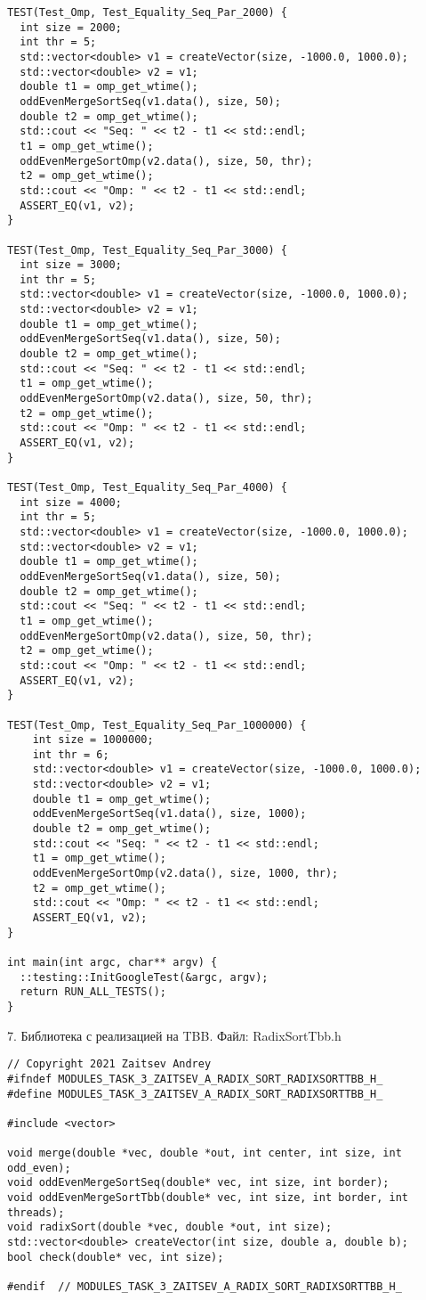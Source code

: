 \documentclass{report}
\begin{document}
\begin{lstlisting}
TEST(Test_Omp, Test_Equality_Seq_Par_2000) {
  int size = 2000;
  int thr = 5;
  std::vector<double> v1 = createVector(size, -1000.0, 1000.0);
  std::vector<double> v2 = v1;
  double t1 = omp_get_wtime();
  oddEvenMergeSortSeq(v1.data(), size, 50);
  double t2 = omp_get_wtime();
  std::cout << "Seq: " << t2 - t1 << std::endl;
  t1 = omp_get_wtime();
  oddEvenMergeSortOmp(v2.data(), size, 50, thr);
  t2 = omp_get_wtime();
  std::cout << "Omp: " << t2 - t1 << std::endl;
  ASSERT_EQ(v1, v2);
}

TEST(Test_Omp, Test_Equality_Seq_Par_3000) {
  int size = 3000;
  int thr = 5;
  std::vector<double> v1 = createVector(size, -1000.0, 1000.0);
  std::vector<double> v2 = v1;
  double t1 = omp_get_wtime();
  oddEvenMergeSortSeq(v1.data(), size, 50);
  double t2 = omp_get_wtime();
  std::cout << "Seq: " << t2 - t1 << std::endl;
  t1 = omp_get_wtime();
  oddEvenMergeSortOmp(v2.data(), size, 50, thr);
  t2 = omp_get_wtime();
  std::cout << "Omp: " << t2 - t1 << std::endl;
  ASSERT_EQ(v1, v2);
}

TEST(Test_Omp, Test_Equality_Seq_Par_4000) {
  int size = 4000;
  int thr = 5;
  std::vector<double> v1 = createVector(size, -1000.0, 1000.0);
  std::vector<double> v2 = v1;
  double t1 = omp_get_wtime();
  oddEvenMergeSortSeq(v1.data(), size, 50);
  double t2 = omp_get_wtime();
  std::cout << "Seq: " << t2 - t1 << std::endl;
  t1 = omp_get_wtime();
  oddEvenMergeSortOmp(v2.data(), size, 50, thr);
  t2 = omp_get_wtime();
  std::cout << "Omp: " << t2 - t1 << std::endl;
  ASSERT_EQ(v1, v2);
}

TEST(Test_Omp, Test_Equality_Seq_Par_1000000) {
	int size = 1000000;
	int thr = 6;
	std::vector<double> v1 = createVector(size, -1000.0, 1000.0);
	std::vector<double> v2 = v1;
	double t1 = omp_get_wtime();
	oddEvenMergeSortSeq(v1.data(), size, 1000);
	double t2 = omp_get_wtime();
	std::cout << "Seq: " << t2 - t1 << std::endl;
	t1 = omp_get_wtime();
	oddEvenMergeSortOmp(v2.data(), size, 1000, thr);
	t2 = omp_get_wtime();
	std::cout << "Omp: " << t2 - t1 << std::endl;
	ASSERT_EQ(v1, v2);
}

int main(int argc, char** argv) {
  ::testing::InitGoogleTest(&argc, argv);
  return RUN_ALL_TESTS();
}
\end{lstlisting}

\par 7. Библиотека с реализацией на TBB. Файл: RadixSortTbb.h
\begin{lstlisting}
// Copyright 2021 Zaitsev Andrey
#ifndef MODULES_TASK_3_ZAITSEV_A_RADIX_SORT_RADIXSORTTBB_H_
#define MODULES_TASK_3_ZAITSEV_A_RADIX_SORT_RADIXSORTTBB_H_

#include <vector>

void merge(double *vec, double *out, int center, int size, int odd_even);
void oddEvenMergeSortSeq(double* vec, int size, int border);
void oddEvenMergeSortTbb(double* vec, int size, int border, int threads);
void radixSort(double *vec, double *out, int size);
std::vector<double> createVector(int size, double a, double b);
bool check(double* vec, int size);

#endif  // MODULES_TASK_3_ZAITSEV_A_RADIX_SORT_RADIXSORTTBB_H_
\end{lstlisting}
\end{document}
